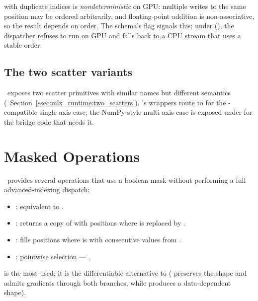  with duplicate indices is \emph{nondeterministic}
on GPU: multiple writes to the same position may be ordered
arbitrarily, and floating-point addition is non-associative, so
the result depends on order. The schema's
 flag signals this; under
 (),
the dispatcher refuses to run  on GPU and falls
back to a CPU stream that uses a stable order.

\subsection{The two scatter variants}
\label{ssec:indexing:two_scatters}

\MLX\ exposes two scatter primitives with similar names but
different semantics (~Section~\ref{ssec:mlx_runtime:two_scatters}).
\Lucid's wrappers route to  for the
-compatible single-axis case; the NumPy-style
multi-axis case is exposed under
 for the bridge code that needs
it.

\section{Masked Operations}
\label{sec:indexing:masked}

\Lucid\ provides several operations that use a boolean mask
without performing a full advanced-indexing dispatch:

\begin{itemize}
  \item {}: equivalent to .
  \item {}: returns a copy of
     with positions where  is 
    replaced by .
  \item {}: fills positions
    where  is  with consecutive values from
    .
  \item {}: pointwise selection ---
    .
\end{itemize}

 is the most-used; it is the differentiable
alternative to  ( preserves the
shape and admits gradients through both branches, while
 produces a data-dependent shape).

